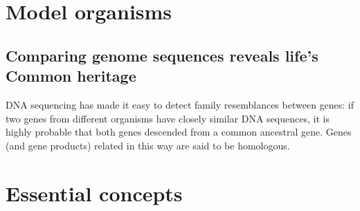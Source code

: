 \section{Model organisms}

\subsection{Comparing genome sequences reveals life’s Common heritage}

DNA sequencing has made it easy to detect family resemblances between
genes: if two genes from different organisms have closely similar DNA
sequences, it is highly probable that both genes descended from a common
ancestral gene. Genes (and gene products) related in this way are
said to be homologous.

\section{Essential concepts}

